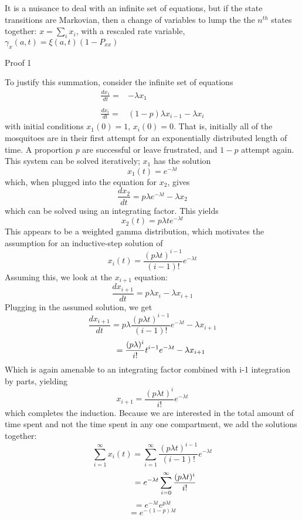 \documentclass{article}
\begin{document}
It is a nuisance to deal with an infinite set of equations, but
if the state transitions are Markovian, then a change of
variables to lump the the $n^{th}$ states together: $x = \sum_i
x_i$, with a rescaled rate variable, $\gamma_x(a,t) =
\xi(a,t) (1-P_{xx})$   

\begin{bf}
Proof 1
\end{bf}

To justify this summation, consider the infinite set of equations
\begin{equation}\begin{array}{rl}
\frac{d x_1}{dt} =& -\lambda x_1 \\&\\
\frac{d x_i}{dt} =& (1-p) \lambda x_{i-1} - \lambda x_i
\end{array}\end{equation}
with initial conditions $x_1(0) = 1$, $x_i(0) = 0$. That is, initially
all of the mosquitoes are in their first attempt for an exponentially
distributed length of time. A proportion $p$ are successful or leave frustrated,
and $1-p$ attempt again. This system can be solved iteratively; $x_1$ has the solution
$$x_1(t) = e^{-\lambda t}$$ 
which, when plugged into the equation for $x_2$, gives
$$\frac{d x_2}{dt} = p \lambda e^{-\lambda t} - \lambda x_2$$ 
which can be solved using an integrating factor. This yields
$$x_2(t) = p \lambda t e^{-\lambda t}$$
This appears to be a weighted gamma distribution, which motivates the
assumption for an inductive-step solution of
$$x_i(t) = \frac{(p \lambda t)^{i-1}}{(i-1)!} e^{-\lambda t}$$
Assuming this, we look at the $x_{i+1}$ equation:
$$\frac{d x_{i+1}}{dt} = p\lambda x_i - \lambda x_{i+1}$$
Plugging in the assumed solution, we get
$$\frac{d x_{i+1}}{dt} = p\lambda \frac{(p \lambda t)^{i-1}}{(i-1)!} e^{-\lambda t} - \lambda x_{i+1}$$
$$\indent \hspace*{.1cm}  = \frac{(p \lambda)^i}{i!}t^{i-1} e^{-\lambda t} - \lambda x_{i+1}$$
Which is again amenable to an integrating factor combined with i-1 integration by parts,
yielding
$$x_{i+1} = \frac{(p \lambda t)^{i}}{i!} e^{-\lambda t}$$
which completes the induction.
Because we are interested in the total amount of time spent and not the time
spent in any one compartment, we add the solutions together:
$$\sum_{i = 1}^{\infty} x_i(t) = \sum_{i = 1}^{\infty}\frac{(p \lambda t)^{i-1}}{(i-1)!} e^{-\lambda t}$$
$$ \indent \indent = e^{-\lambda t} \sum_{i=0}^{\infty}\frac{(p \lambda t)^i}{i!}$$
$$ = e^{-\lambda t} e^{p\lambda t}$$
$$ = e^{-(1-p) \lambda t}$$
\end{document}
